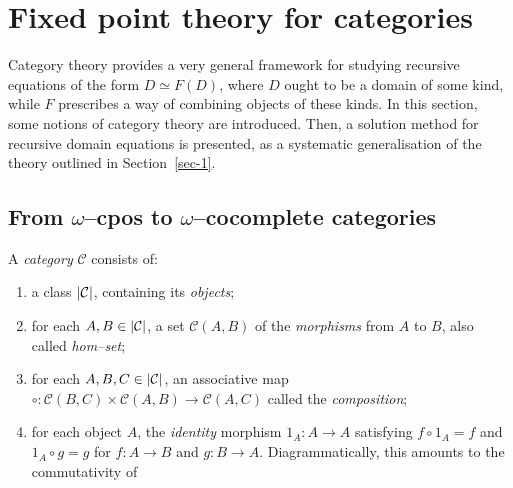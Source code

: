 \section{Fixed point theory for categories}\label{sec-2}

Category theory provides a very general framework for studying
recursive equations of the form \(D \simeq F(D)\), where \(D\) ought to be a domain of some kind, while \(F\) prescribes a way of
combining objects of these kinds.
In this section, some notions of category theory are introduced.
Then, a solution method for recursive domain equations is presented, as a
systematic generalisation of the theory outlined in Section~\ref{sec-1}.

\subsection{From \(\omega\)--cpos to \(\omega\)--cocomplete categories}%

\begin{dfn}
  A \emph{category} \(\mathcal{C}\) consists of:
  \begin{enumerate}
    \item a class \(\lvert \mathcal{C} \rvert\), containing its \emph{objects};
    \item for each \(A, B \in \lvert \mathcal{C} \rvert\),
    a set \(\mathcal{C}(A,B)\) of the \emph{morphisms} from \(A\) to \(B\), also called \emph{hom--set}; %
    \item for each \(A,B,C \in \lvert \mathcal{C} \rvert\), an associative map
    \(
      \circ \colon \mathcal{C}(B,C) \times \mathcal{C}(A,B) \to \mathcal{C}(A,C)
    \)
    called the \emph{composition};
    \item for each object \(A\), the \emph{identity} morphism \(1_A \colon A \to A\) satisfying \(f \circ 1_A = f\) and \(1_A \circ g = g\) for \(f \colon A \to B\) and \(g \colon B \to A\).
    Diagrammatically, this amounts to the commutativity of
    \begin{center}
    \end{center}
  \end{enumerate}
\end{dfn}

